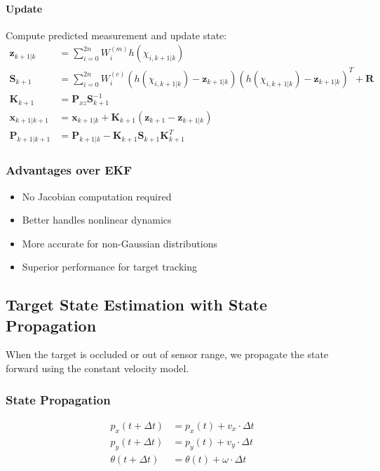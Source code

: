 \documentclass[11pt,a4paper]{article}
\begin{document}
\paragraph{Update}
Compute predicted measurement and update state:
\begin{align}
\mathbf{z}_{k+1|k} &= \sum_{i=0}^{2n} W_i^{(m)} h(\chi_{i,k+1|k}) \nonumber \\
\mathbf{S}_{k+1} &= \sum_{i=0}^{2n} W_i^{(c)} (h(\chi_{i,k+1|k}) - \mathbf{z}_{k+1|k})(h(\chi_{i,k+1|k}) - \mathbf{z}_{k+1|k})^T + \mathbf{R} \nonumber \\
\mathbf{K}_{k+1} &= \mathbf{P}_{xz} \mathbf{S}_{k+1}^{-1} \nonumber \\
\mathbf{x}_{k+1|k+1} &= \mathbf{x}_{k+1|k} + \mathbf{K}_{k+1} (\mathbf{z}_{k+1} - \mathbf{z}_{k+1|k}) \nonumber \\
\mathbf{P}_{k+1|k+1} &= \mathbf{P}_{k+1|k} - \mathbf{K}_{k+1} \mathbf{S}_{k+1} \mathbf{K}_{k+1}^T \nonumber
\end{align}

\subsubsection{Advantages over EKF}

\begin{itemize}
    \item No Jacobian computation required
    \item Better handles nonlinear dynamics
    \item More accurate for non-Gaussian distributions
    \item Superior performance for target tracking
\end{itemize}

\subsection{Target State Estimation with State Propagation}

When the target is occluded or out of sensor range, we propagate the state forward using the constant velocity model.

\subsubsection{State Propagation}

\begin{align}
p_x(t + \Delta t) &= p_x(t) + v_x \cdot \Delta t \nonumber \\
p_y(t + \Delta t) &= p_y(t) + v_y \cdot \Delta t \nonumber \\
\theta(t + \Delta t) &= \theta(t) + \omega \cdot \Delta t \nonumber
\end{align}
\end{document}
